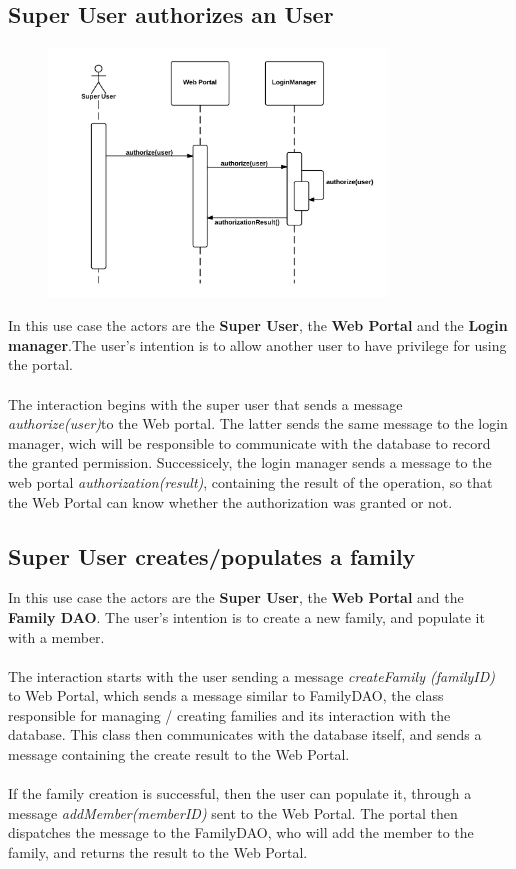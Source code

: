 \subsection{Super User authorizes an User}
	\begin{figure}[ht!]
	\centering
	\includegraphics[width=90mm]{../Slides/images/Presentation_short_SSD_1.png}
	\label{overflow}
	\end{figure}
In this use case the actors are the \textbf{Super User}, the \textbf{Web Portal} and the \textbf{Login manager}.The user's intention is to allow another user to have privilege for using the portal.\\
\\The interaction begins with the super user that sends a message \emph{authorize(user)}to the Web portal. The latter sends the same message to the login manager, wich will be responsible to communicate with the database to record the granted permission. Successicely, the login manager sends a message to the web portal \emph{authorization(result)}, containing the result of the operation, so that the Web Portal can know whether the authorization was granted or not.

\subsection{Super User creates/populates a family}

In this use case the actors are the \textbf{Super User}, the \textbf{Web Portal} and the \textbf{Family DAO}. The user's intention is to create a new family, and populate it with a member. \\
\\The interaction starts with the user sending a message \emph{createFamily (familyID)} to Web Portal, which sends a message similar to FamilyDAO, the class responsible for managing / creating families and its interaction with the database. This class then communicates with the database itself, and sends a message containing the create result to the Web Portal. \\
\\If the family creation is successful, then the user can populate it, through a message  \emph{addMember(memberID)} sent to the Web Portal. The portal then dispatches the message to the FamilyDAO, who will add the member to the family, and returns the result to the Web Portal.

